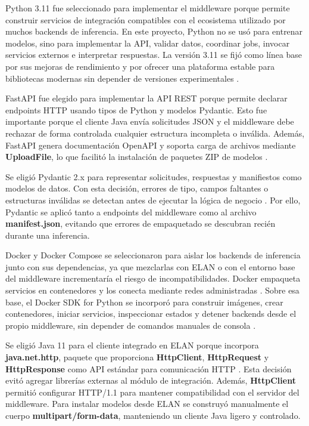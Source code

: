\documentclass[11pt,a4paper]{article}
\begin{document}
Python 3.11 fue seleccionado para implementar el middleware porque permite construir servicios de integración compatibles con el ecosistema utilizado por muchos backends de inferencia. En este proyecto, Python no se usó para entrenar modelos, sino para implementar la API, validar datos, coordinar jobs, invocar servicios externos e interpretar respuestas. La versión 3.11 se fijó como línea base por sus mejoras de rendimiento y por ofrecer una plataforma estable para bibliotecas modernas sin depender de versiones experimentales \cite{python311docs}.

FastAPI fue elegido para implementar la API REST porque permite declarar endpoints HTTP usando tipos de Python y modelos Pydantic. Esto fue importante porque el cliente Java envía solicitudes JSON y el middleware debe rechazar de forma controlada cualquier estructura incompleta o inválida. Además, FastAPI genera documentación OpenAPI y soporta carga de archivos mediante \textbf{UploadFile}, lo que facilitó la instalación de paquetes ZIP de modelos \cite{fastapi2026features}.

Se eligió Pydantic 2.x para representar solicitudes, respuestas y manifiestos como modelos de datos. Con esta decisión, errores de tipo, campos faltantes o estructuras inválidas se detectan antes de ejecutar la lógica de negocio \cite{pydantic2026models}. Por ello, Pydantic se aplicó tanto a endpoints del middleware como al archivo \textbf{manifest.json}, evitando que errores de empaquetado se descubran recién durante una inferencia.

Docker y Docker Compose se seleccionaron para aislar los backends de inferencia junto con sus dependencias, ya que mezclarlas con ELAN o con el entorno base del middleware incrementaría el riesgo de incompatibilidades. Docker empaqueta servicios en contenedores y los conecta mediante redes administradas \cite{docker2026overview}. Sobre esa base, el Docker SDK for Python se incorporó para construir imágenes, crear contenedores, iniciar servicios, inspeccionar estados y detener backends desde el propio middleware, sin depender de comandos manuales de consola \cite{docker_sdk_python}.

Se eligió Java 11 para el cliente integrado en ELAN porque incorpora \textbf{java.net.http}, paquete que proporciona \textbf{HttpClient}, \textbf{HttpRequest} y \textbf{HttpResponse} como API estándar para comunicación HTTP \cite{java11_httpclient}. Esta decisión evitó agregar librerías externas al módulo de integración. Además, \textbf{HttpClient} permitió configurar HTTP/1.1 para mantener compatibilidad con el servidor del middleware. Para instalar modelos desde ELAN se construyó manualmente el cuerpo \textbf{multipart/form-data}, manteniendo un cliente Java ligero y controlado.
\end{document}

